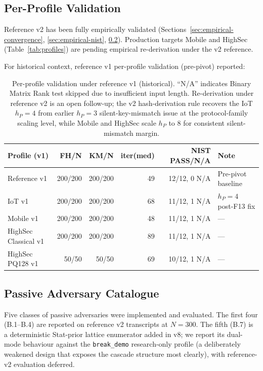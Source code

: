 \documentclass[11pt,a4paper]{article}
\begin{document}
\subsection{Per-Profile Validation}\label{sec:empirical-profiles}

Reference v2 has been fully empirically validated (Sections~\ref{sec:empirical-convergence}, \ref{sec:empirical-nist}, \ref{sec:empirical-attackers}). Production targets Mobile and HighSec (Table~\ref{tab:profiles}) are pending empirical re-derivation under the v2 reference.

For historical context, reference v1 per-profile validation (pre-pivot) reported:

\begin{table}[ht]
\centering
\small
\begin{tabular}{lrrrrl}
\toprule
Profile (v1) & FH/N & KM/N & iter(med) & NIST PASS/N/A & Note \\
\midrule
Reference v1 & 200/200 & 200/200 & 49 & 12/12, 0 N/A & Pre-pivot baseline \\
IoT v1 & 200/200 & 200/200 & 68 & 11/12, 1 N/A & $h_P=4$ post-F13 fix \\
Mobile v1 & 200/200 & 200/200 & 48 & 11/12, 1 N/A & --- \\
HighSec Classical v1 & 200/200 & 200/200 & 89 & 11/12, 1 N/A & --- \\
HighSec PQ128 v1 & 50/50 & 50/50 & 69 & 10/12, 1 N/A & --- \\
\bottomrule
\end{tabular}
\caption{Per-profile validation under reference v1 (historical). ``N/A'' indicates Binary Matrix Rank test skipped due to insufficient input length. Re-derivation under reference v2 is an open follow-up; the v2 hash-derivation rule recovers the IoT $h_P = 4$ from earlier $h_P = 3$ silent-key-mismatch issue at the protocol-family scaling level, while Mobile and HighSec scale $h_P$ to $8$ for consistent silent-mismatch margin.}
\label{tab:profiles-validation}
\end{table}

\subsection{Passive Adversary Catalogue}\label{sec:empirical-attackers}

Five classes of passive adversaries were implemented and evaluated. The first four (B.1--B.4) are reported on reference v2 transcripts at $N = 300$. The fifth (B.7) is a deterministic Stat-prior lattice enumerator added in v8; we report its dual-mode behaviour against the \texttt{break\_demo} research-only profile (a deliberately weakened design that exposes the cascade structure most clearly), with reference-v2 evaluation deferred.
\end{document}
